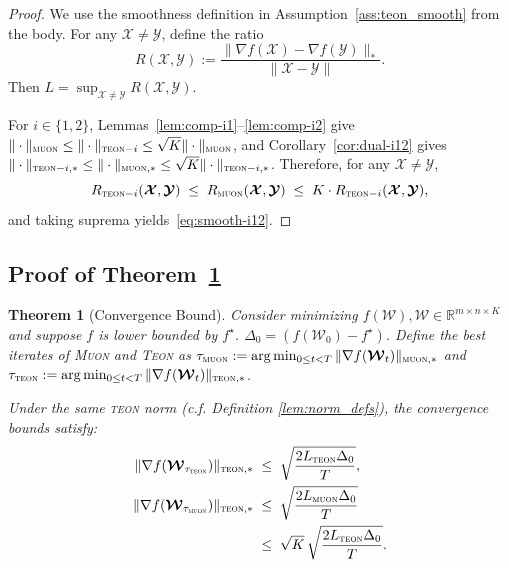 \documentclass{article}
\newcommand{\ten}[1]{\bm{\mathcal{#1}}}
\theoremstyle{plain}
\newtheorem{theorem}{Theorem}[section]
\theoremstyle{definition}
\theoremstyle{remark}
\begin{document}
\begin{proof}
We use the smoothness definition in Assumption~\ref{ass:teon_smooth} from the body.
For any $\ten{X}\neq \ten{Y}$, define the ratio
\[
R(\ten{X},\ten{Y})
:=
\frac{\|\nabla f(\ten{X})-\nabla f(\ten{Y})\|_{*}}
{\|\ten{X}-\ten{Y}\|}.
\]
Then $L=\sup_{\ten{X}\neq \ten{Y}} R(\ten{X},\ten{Y})$.

For $i\in\{1,2\}$, Lemmas~\ref{lem:comp-i1}--\ref{lem:comp-i2} give
$\|\cdot\|_{\textsc{muon}}\le \|\cdot\|_{\textsc{teon}-i}\le \sqrt{K}\|\cdot\|_{\textsc{muon}}$,
and Corollary~\ref{cor:dual-i12} gives
$\|\cdot\|_{\textsc{teon}-i,*}\le \|\cdot\|_{\textsc{muon},*}\le \sqrt{K}\|\cdot\|_{\textsc{teon}-i,*}$.
Therefore, for any $\ten{X}\neq \ten{Y}$,
\[
R_{\textsc{teon}-i}(\ten{X},\ten{Y})
\;\le\;
R_{\textsc{muon}}(\ten{X},\ten{Y})
\;\le\;
K\cdot R_{\textsc{teon}-i}(\ten{X},\ten{Y}),
\]
and taking suprema yields~\eqref{eq:smooth-i12}.


\end{proof}

\subsection{Proof of Theorem~\ref{thm:convergence_bound}} \label{app:Convergence gurantee comparison}

\begin{theorem}[Convergence Bound]
Consider minimizing $f(\ten{W}), \ten{W}\in \mathbb{R}^{m\times n\times K}$ 
and suppose $f$ is lower bounded by $f^\star$. $\Delta_0=\left(f(\ten{W}_0)-f^\star\right)$.
Define the best iterates of \textsc{Muon} and \textsc{Teon} as
$\tau_{\textsc{muon}} := \arg\min_{0\le t < T}\|\nabla f(\ten{W}_t)\|_{\textsc{muon},*}$
and
$\tau_{\textsc{teon}} := \arg\min_{0\le t < T}\|\nabla f(\ten{W}_t)\|_{\textsc{teon},*}$.

Under the same \textsc{teon} norm (c.f. Definition \ref{lem:norm_defs}), the convergence bounds satisfy:
\label{thm:convergence_bound}
\begin{align}
\|\nabla f(\ten{W}_{\tau_{\textsc{teon}}})\|_{\textsc{teon},*}
&\;\le\;
\sqrt{\frac{2L_{\textsc{teon}}\Delta_0}{T}}, \nonumber
\\
\|\nabla f(\ten{W}_{\tau_{\textsc{muon}}})\|_{\textsc{teon},*}
&\;\le\;
\sqrt{\frac{2L_{\textsc{muon}}\Delta_0}{T}} 
\\
&\;\le\;
\sqrt{K}\,
\sqrt{\frac{2L_{\textsc{teon}}\Delta_0}{T}} .\nonumber
\end{align}
\end{theorem}
\end{document}
